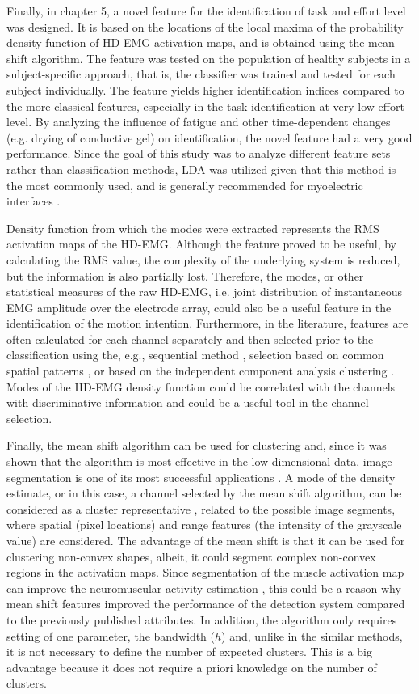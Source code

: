 Finally, in chapter 5, a novel feature for the identification of task and effort level was designed. It is based on the locations of the local maxima of the probability density function of HD-EMG activation maps, and is obtained using the mean shift algorithm. The feature was tested on the population of healthy subjects in a subject-specific approach, that is, the classifier was trained and tested for each subject individually. The feature yields higher identification indices compared to the more classical features, especially in the task identification at very low effort level. By analyzing the influence of fatigue and other time-dependent changes (e.g. drying of conductive gel) on identification, the novel feature had a very good performance. Since the goal of this study was to analyze different feature sets rather than classification methods, LDA was utilized given that this method is the most commonly used, and is generally recommended for myoelectric interfaces \citep{Hakonen2015}.

Density function from which the modes were extracted represents the RMS activation maps of the HD-EMG. Although the feature proved to be useful, by calculating the RMS value, the complexity of the underlying system is reduced, but the information is also partially lost. Therefore, the modes, or other statistical measures of the raw HD-EMG, i.e. joint distribution of instantaneous EMG amplitude over the electrode array, could also be a useful feature in the identification of the motion intention. Furthermore, in the literature, features are often calculated for each channel separately and then selected prior to the classification using the, e.g., sequential method \citep{Hargrove2009, Li2017}, selection based on common spatial patterns \citep{Geng2014}, or based on the independent component analysis clustering \citep{Naik2016}. Modes of the HD-EMG density function could be correlated with the channels with discriminative information and could be a useful tool in the channel selection.

Finally, the mean shift algorithm can be used for clustering and, since it was shown that the algorithm is most effective in the low-dimensional data, image segmentation is one of its most successful applications \citep{Comaniciu2002}. A mode of the density estimate, or in this case, a channel selected by the mean shift algorithm, can be considered as a cluster representative \citep{Hennig2015}, related to the possible image segments, where spatial (pixel locations) and range features (the intensity of the grayscale value) are considered. The advantage of the mean shift is that it can be used for clustering non-convex shapes, albeit, it could segment complex non-convex regions in the activation maps. Since segmentation of the muscle activation map can improve the neuromuscular activity estimation \citep{Vieira2010}, this could be a reason why mean shift features improved the performance of the detection system compared to the previously published attributes. In addition, the algorithm only requires setting of one parameter, the bandwidth ($h$) and, unlike in the similar methods, it is not necessary to define the number of expected clusters. This is a big advantage because it does not require a priori knowledge on the number of clusters.

